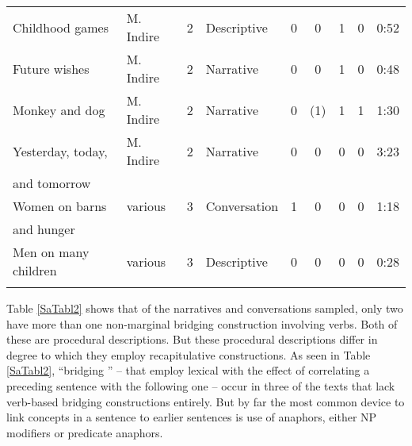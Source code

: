 \documentclass[output=paper]{LSP/langsci}
\begin{document}
\begin{sidewaystable}[]
\begin{tabular}{llclccrcS[table-format=1.2,input-decimal-markers={:},output-decimal-marker = {:}]}
Childhood games            & M. Indire        & 2     & Descriptive    & 0                    & 0                     & 1                & 0                  & 0:52             \\
Future wishes              & M. Indire        & 2     & Narrative      & 0                    & 0                     & 1                & 0                  & 0:48             \\
Monkey and dog             & M. Indire        & 2     & Narrative      & 0                    & (1)                   & 1                & 1                  & 1:30             \\
Yesterday, today,  & M. Indire        & 2     & Narrative      & 0                    & 0                     & 0                & 0                  & 3:23             \\
and tomorrow &         &      &       &                     &                      &                 &                   &             \\
Women on barns   & various          & 3       & Conversation  & 1                    & 0                     & 0                & 0                  & 1:18             \\
 and hunger  &           &        &   &                     &                      &                 &                   &           \\
Men on many children       & various          & 3      & Descriptive    & 0                    & 0                     & 0                & 0                  & 0:28        \\  
\lspbottomrule  
\end{tabular}
\end{sidewaystable}
%
 
Table \ref{SaTabl2} shows that of the narratives and conversations sampled, only two have more than one non-marginal bridging construction involving verbs. Both of these are procedural descriptions. But these procedural descriptions differ in degree to which they employ recapitulative constructions. As seen in Table \ref{SaTabl2}, ``bridging '' --  that employ lexical  with the effect of correlating a preceding sentence with the following one -- occur in three of the texts that lack verb-based bridging constructions entirely. But by far the most common device to link concepts in a sentence to earlier sentences is use of anaphors, either NP modifiers or predicate anaphors. 
\end{document}
